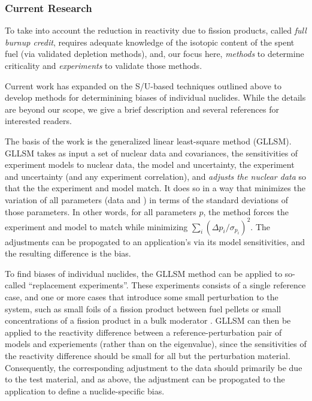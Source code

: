 \subsubsection*{Current Research}

To take into account the reduction in reactivity due to fission products,
called \textit{full burnup credit}, requires adequate knowledge of the 
isotopic content of the spent fuel (via validated depletion methods), and, 
our focus here, \textit{methods} to determine criticality and 
\textit{experiments} to validate those methods.

Current work has expanded on the S/U-based techniques
outlined above to develop methods for determinining biases of 
individual nuclides. While the details are beyond our scope, we give 
a brief description and several references for interested readers.

The basis of the work is the generalized linear least-square method (GLLSM).
GLLSM takes as input a set of nuclear data and covariances, the sensitivities 
of experiment models to nuclear data, the model \keff and uncertainty,
the experiment \keff and uncertainty (and any experiment correlation), 
and \textit{adjusts the nuclear data}
so that the the experiment and model \keff match.  It does so in a way that
minimizes the variation of all parameters (data and \keff) in terms of the
standard deviations of those parameters.  In other words, for all parameters
$p$, the method forces the experiment and model \keff to match while 
minimizing $\sum_i (\Delta p_i / \sigma_{p_i})^2$.  The adjustments can be 
propogated to an application's \keff via its model sensitivities, and the 
resulting difference is the bias.

To find biases of individual nuclides, the GLLSM method can be applied to 
so-called ``replacement experiments''.  These experiments consists of a single
reference case, and one or more cases that introduce some small perturbation
to the system, such as small foils of a fission product between fuel pellets 
\cite{buccx} or small concentrations of a fission product in a bulk
moderator \cite{french}.  GLLSM can then be applied to the reactivity 
difference between a reference-perturbation pair of models and experiements 
(rather than on the eigenvalue), since the sensitivities of the 
reactivity difference should be small for all but the perturbation 
material.  Consequently, the corresponding adjustment to the data should 
primarily be due to the test material, and as above, the adjustment can 
be propogated to the application to define a nuclide-specific bias.

